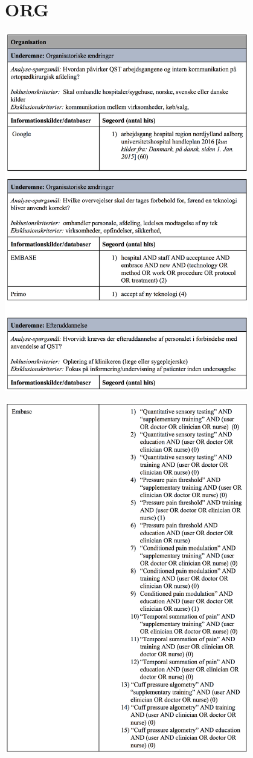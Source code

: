 \section{ORG}\label{ORG_sog}
\begin{center}
\includegraphics[width=0.8\textwidth]{rapportAfsnit/qBilag/sogninger/ORG1}

\includegraphics[width=0.8\textwidth]{rapportAfsnit/qBilag/sogninger/ORG2}


\end{center}
